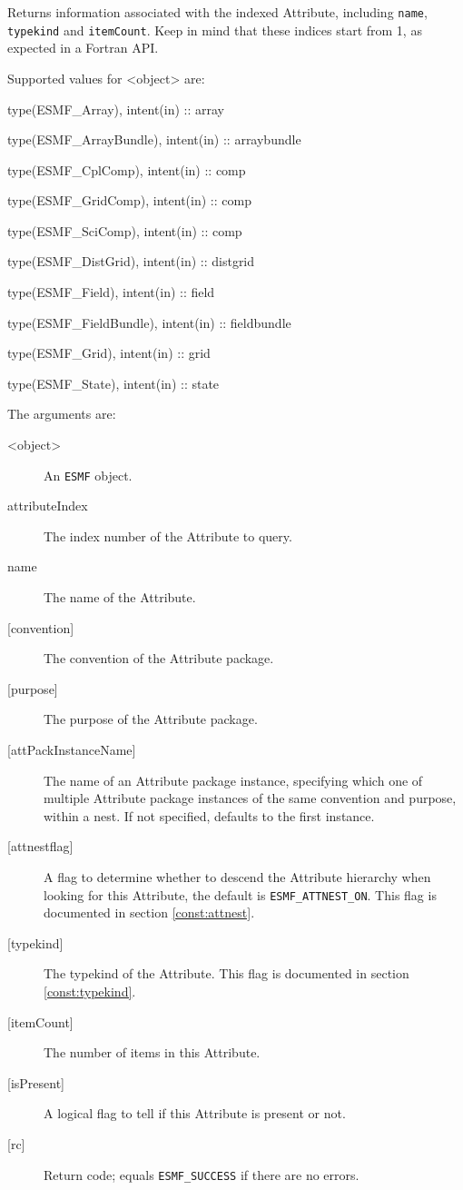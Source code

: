    Returns information associated with the indexed Attribute,
   including {\tt name}, {\tt typekind} and {\tt itemCount}. Keep in
   mind that these indices start from 1, as expected in a Fortran API.
  
   Supported values for <object> are:
   \begin{description}
   \item type(ESMF\_Array), intent(in) :: array
   \item type(ESMF\_ArrayBundle), intent(in) :: arraybundle
   \item type(ESMF\_CplComp), intent(in) :: comp
   \item type(ESMF\_GridComp), intent(in) :: comp
   \item type(ESMF\_SciComp), intent(in) :: comp
   \item type(ESMF\_DistGrid), intent(in) :: distgrid
   \item type(ESMF\_Field), intent(in) :: field
   \item type(ESMF\_FieldBundle), intent(in) :: fieldbundle
   \item type(ESMF\_Grid), intent(in) :: grid
   \item type(ESMF\_State), intent(in) :: state
   \end{description}
  
   The arguments are:
   \begin{description}
   \item [<object>]
   An {\tt ESMF} object.
   \item [attributeIndex]
   The index number of the Attribute to query.
   \item [name]
   The name of the Attribute.
   \item [{[convention]}]
   The convention of the Attribute package.
   \item [{[purpose]}]
   The purpose of the Attribute package.
   \item [{[attPackInstanceName]}]
   The name of an Attribute package instance, specifying which one
   of multiple Attribute package instances of the same convention
   and purpose, within a nest. If not specified, defaults to the
   first instance.
   \item [{[attnestflag]}]
   A flag to determine whether to descend the
   Attribute hierarchy when looking for this Attribute, the default
   is {\tt ESMF\_ATTNEST\_ON}. This flag is documented in section
   \ref{const:attnest}.
   \item [{[typekind]}]
   The typekind of the Attribute. This flag is documented in section
   \ref{const:typekind}.
   \item [{[itemCount]}]
   The number of items in this Attribute.
   \item [{[isPresent]}]
   A logical flag to tell if this Attribute is present or not.
   \item [{[rc]}]
   Return code; equals {\tt ESMF\_SUCCESS} if there are no errors.
   \end{description}
  
